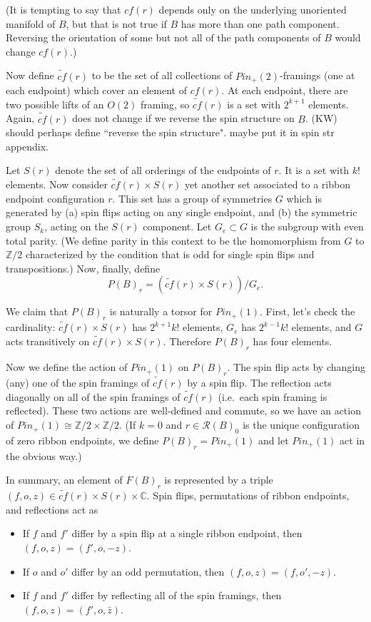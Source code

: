 \documentclass[12pt,a4paper]{article}
\newcommand{\zz}{\mathbb{Z}}
\newcommand{\cc}{\mathbb{C}}
\newcommand{\mcr}{\mathcal{R}}
\newcommand\be            {\begin{equation}}
\newcommand\ee            {\end{equation}}
\newcommand{\kw}[1]{{\color{kwcolor}\footnotesize{(KW) #1}}}
\begin{document}
(It is tempting to say that $cf(r)$ depends only on the underlying unoriented manifold of $B$, but that
is not true if $B$ has more than one path component.
Reversing the orientation of some but not all of the path components of $B$ would change $cf(r)$.)

\newcommand{\tcf}{\widetilde{cf}}

Now define $\tcf(r)$ to be the set of all collections of $Pin_+(2)$-framings (one at each endpoint)
which cover an element of $cf(r)$.
At each endpoint, there are two possible lifts of an $O(2)$ framing, 
so $\tcf(r)$ is a set with $2^{k+1}$ elements.
Again, $\tcf(r)$ does not change if we reverse the spin structure on $B$.
\kw{should perhaps define ``reverse the spin structure".  maybe put it in spin str appendix.}

Let $S(r)$ denote the set of all orderings of the endpoints of $r$.
It is a set with $k!$ elements.
Now consider $\tcf(r) \times S(r)$ yet another set associated to a ribbon endpoint configuration $r$.
This set has a group of symmetries $G$ which is generated by (a) spin flips acting on any single endpoint, 
and (b) the symmetric group $S_k$, acting on the $S(r)$ component.
Let $G_e \subset G$ is the subgroup with even total parity.
(We define parity in this context to be the homomorphism from $G$ to $\zz/2$
characterized by the condition that is odd for single spin flips and transpositions.)
Now, finally, define
\be
	P(B)_r = (\tcf(r) \times S(r))/G_e .
\ee

We claim that $P(B)_r$ is naturally a torsor for $Pin_+(1)$.
First, let's check the cardinality:
$\tcf(r) \times S(r)$ has $2^{k+1} k!$ elements,
$G_e$ has $2^{k-1} k!$ elements, and $G$ acts transitively on $\tcf(r) \times S(r)$.
Therefore $P(B)_r$ has four elements.

Now we define the action of $Pin_+(1)$ on $P(B)_r$.
The spin flip acts by changing (any) one of the spin framings of $\tcf(r)$ by a spin flip.
The reflection acts diagonally on all of the spin framings of $\tcf(r)$
(i.e.\ each spin framing is reflected).
These two actions are well-defined and commute, so we have
an action of $Pin_+(1) \cong \zz/2\times\zz/2$.
(If $k = 0$ and $r \in \mcr(B)_0$ is the unique configuration of zero ribbon endpoints,
we define $P(B)_r = Pin_+(1)$ and let $Pin_+(1)$ act in the obvious way.)

\medskip

In summary, an element of $F(B)_r$ is represented by a triple $(f, o, z) \in \tcf(r) \times S(r) \times \cc$.
Spin flips, permutations of ribbon endpoints, and reflections act as
\begin{itemize}
\item If $f$ and $f'$ differ by a spin flip at a single ribbon endpoint, then $(f, o, z) = (f', o, -z)$.
\item If $o$ and $o'$ differ by an odd permutation, then $(f, o, z) = (f, o', -z)$.
\item If $f$ and $f'$ differ by reflecting all of the spin framings, then $(f, o, z) = (f', o, \bar z)$.
\end{itemize}
\end{document}
